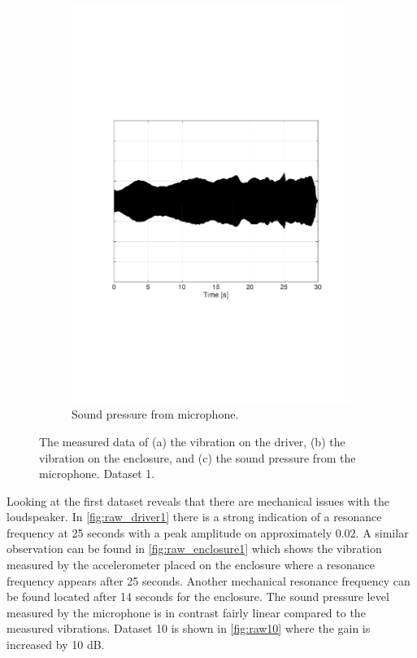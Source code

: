 \begin{figure}[H]
\begin{subfigure}[t]{0.3\textwidth}
	\includegraphics[width=1\textwidth]{figures/raw_microphone1.pdf}
	\caption{Sound pressure from microphone.}
	\label{fig:raw_microphone1}
\end{subfigure}
\caption{The measured data of (a) the vibration on the driver, (b) the vibration on the enclosure, and (c) the sound pressure from the microphone. Dataset 1.}
\label{fig:raw1}
\end{figure} 


Looking at the first dataset reveals that there are mechanical issues with the loudspeaker. In \autoref{fig:raw_driver1} there is a strong indication of a resonance frequency at 25 seconds with a peak amplitude on approximately 0.02. A similar observation can be found in \autoref{fig:raw_enclosure1} which shows the vibration measured by the accelerometer placed on the enclosure where a resonance frequency appears after 25 seconds. Another mechanical resonance frequency can be found located after 14 seconds for the enclosure. The sound pressure level measured by the microphone is in contrast fairly linear compared to the measured vibrations. Dataset 10 is shown in \autoref{fig:raw10} where the gain is increased by 10 dB.

